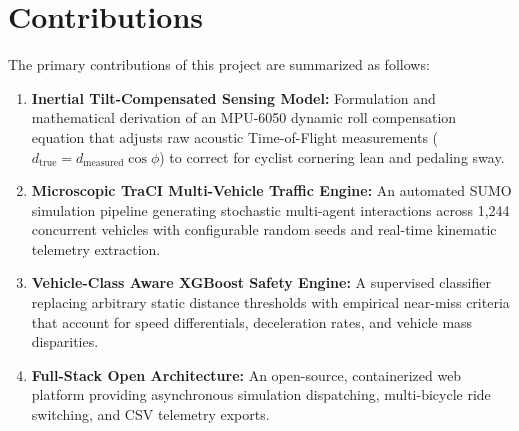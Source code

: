 \section{Contributions}
The primary contributions of this project are summarized as follows:
\begin{enumerate}
    \item \textbf{Inertial Tilt-Compensated Sensing Model:} Formulation and mathematical derivation of an MPU-6050 dynamic roll compensation equation that adjusts raw acoustic Time-of-Flight measurements ($d_{\text{true}} = d_{\text{measured}} \cos\phi$) to correct for cyclist cornering lean and pedaling sway.
    \item \textbf{Microscopic TraCI Multi-Vehicle Traffic Engine:} An automated SUMO simulation pipeline generating stochastic multi-agent interactions across 1,244 concurrent vehicles with configurable random seeds and real-time kinematic telemetry extraction.
    \item \textbf{Vehicle-Class Aware XGBoost Safety Engine:} A supervised classifier replacing arbitrary static distance thresholds with empirical near-miss criteria that account for speed differentials, deceleration rates, and vehicle mass disparities.
    \item \textbf{Full-Stack Open Architecture:} An open-source, containerized web platform providing asynchronous simulation dispatching, multi-bicycle ride switching, and CSV telemetry exports.
\end{enumerate}

